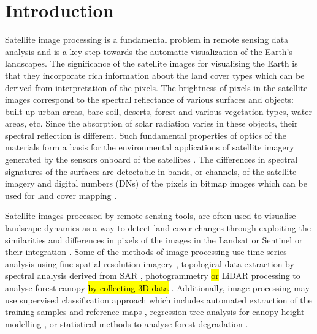 \documentclass[applsci,article,submit,pdftex,moreauthors]{Definitions/mdpi}
\begin{document}
\section{Introduction}
Satellite image processing is a fundamental problem in remote sensing data analysis and is a key step towards the automatic visualization of the Earth's landscapes. The significance of the satellite images for visualising the Earth is that they incorporate rich information about the land cover types which can be derived from interpretation of the pixels. The brightness of pixels in the satellite images correspond to the spectral reflectance of various surfaces and objects: built-up urban areas, bare soil, deserts, forest and various vegetation types, water areas, etc. Since the absorption of solar radiation varies in these objects, their spectral reflection is different. Such fundamental properties of optics of the materials form a basis for the environmental applications of satellite imagery generated by the sensors onboard of the satellites \cite{Lillesand}. The differences in spectral signatures of the surfaces are detectable in bands, or channels, of the satellite imagery and digital numbers (DNs) of the pixels in bitmap images which can be used for land cover mapping \cite{Manakos}. 

Satellite images processed by remote sensing tools, are often used to visualise landscape dynamics as a way to detect land cover changes through exploiting the similarities and differences in pixels of the images in the Landsat \cite{SIKUZANI2020e01333,DUVEILLER20081969} or Sentinel \cite{9554698,Lemenkova202021,9553905} or their integration \cite{ZHANG2021112470,CHEN2021102386}. Some of the methods of image processing use time series analysis using fine spatial resolution imagery \cite{7326202,6352722}, topological data extraction by spectral analysis derived from SAR \cite{1027205,520569},\hl{ }photogrammetry\hl{ or }LiDAR processing to analyse forest canopy \hl{by collecting 3D data }\cite{rs13183777}. Additionally, image processing may use supervised classification approach which includes automated extraction of the training samples and reference maps \cite{rs12172705}, regression tree analysis for canopy height modelling \cite{HANSEN2016221}, or statistical methods to analyse forest degradation \cite{7326141}.
\end{document}
